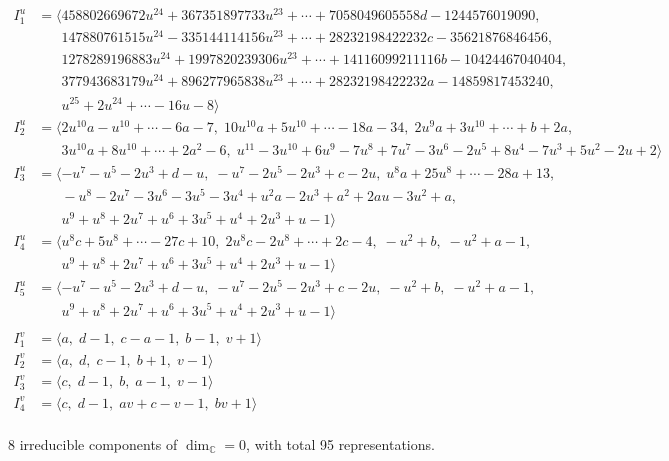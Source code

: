 \documentclass[1p]{elsarticle_modified}
\theoremstyle{definition}
\begin{document}
\begin{align*}
I^u_{1}&=\langle 
458802669672 u^{24}+367351897733 u^{23}+\cdots+7058049605558 d-1244576019090,\\
\phantom{I^u_{1}}&\phantom{= \langle  }147880761515 u^{24}-335144114156 u^{23}+\cdots+28232198422232 c-35621876846456,\\
\phantom{I^u_{1}}&\phantom{= \langle  }1278289196883 u^{24}+1997820239306 u^{23}+\cdots+14116099211116 b-10424467040404,\\
\phantom{I^u_{1}}&\phantom{= \langle  }377943683179 u^{24}+896277965838 u^{23}+\cdots+28232198422232 a-14859817453240,\\
\phantom{I^u_{1}}&\phantom{= \langle  }u^{25}+2 u^{24}+\cdots-16 u-8\rangle \\
I^u_{2}&=\langle 
2 u^{10} a- u^{10}+\cdots-6 a-7,\;10 u^{10} a+5 u^{10}+\cdots-18 a-34,\;2 u^9 a+3 u^{10}+\cdots+b+2 a,\\
\phantom{I^u_{2}}&\phantom{= \langle  }3 u^{10} a+8 u^{10}+\cdots+2 a^2-6,\;u^{11}-3 u^{10}+6 u^9-7 u^8+7 u^7-3 u^6-2 u^5+8 u^4-7 u^3+5 u^2-2 u+2\rangle \\
I^u_{3}&=\langle 
- u^7- u^5-2 u^3+d- u,\;- u^7-2 u^5-2 u^3+c-2 u,\;u^8 a+25 u^8+\cdots-28 a+13,\\
\phantom{I^u_{3}}&\phantom{= \langle  }- u^8-2 u^7-3 u^6-3 u^5-3 u^4+u^2 a-2 u^3+a^2+2 a u-3 u^2+a,\\
\phantom{I^u_{3}}&\phantom{= \langle  }u^9+u^8+2 u^7+u^6+3 u^5+u^4+2 u^3+u-1\rangle \\
I^u_{4}&=\langle 
u^8 c+5 u^8+\cdots-27 c+10,\;2 u^8 c-2 u^8+\cdots+2 c-4,\;- u^2+b,\;- u^2+a-1,\\
\phantom{I^u_{4}}&\phantom{= \langle  }u^9+u^8+2 u^7+u^6+3 u^5+u^4+2 u^3+u-1\rangle \\
I^u_{5}&=\langle 
- u^7- u^5-2 u^3+d- u,\;- u^7-2 u^5-2 u^3+c-2 u,\;- u^2+b,\;- u^2+a-1,\\
\phantom{I^u_{5}}&\phantom{= \langle  }u^9+u^8+2 u^7+u^6+3 u^5+u^4+2 u^3+u-1\rangle \\
\\
I^v_{1}&=\langle 
a,\;d-1,\;c- a-1,\;b-1,\;v+1\rangle \\
I^v_{2}&=\langle 
a,\;d,\;c-1,\;b+1,\;v-1\rangle \\
I^v_{3}&=\langle 
c,\;d-1,\;b,\;a-1,\;v-1\rangle \\
I^v_{4}&=\langle 
c,\;d-1,\;a v+c- v-1,\;b v+1\rangle \\
\end{align*}
\raggedright * 8 irreducible components of $\dim_{\mathbb{C}}=0$, with total 95 representations.\\
\end{document}
